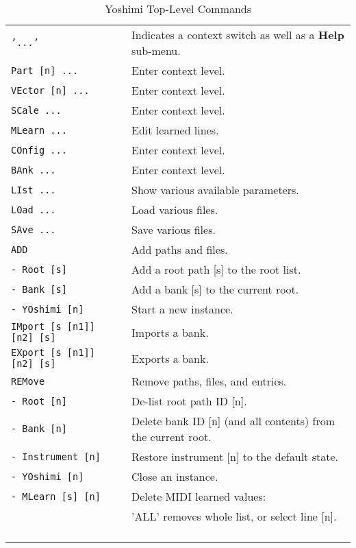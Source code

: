 \begin{center}
\begin{longtable}{p{6cm} p{10cm}}
\caption[Yoshimi Top-Level Commands]{Yoshimi Top-Level Commands} \\
\texttt{'...'} &
   Indicates a context switch as well as a \textbf{Help} sub-menu. \\
\texttt{Part [n] ...} &
   Enter context level. \\
\texttt{VEctor [n] ...} &
   Enter context level. \\
\texttt{SCale ...} &
   Enter context level. \\
\texttt{MLearn ...} &
   Edit learned lines. \\
\texttt{COnfig ...} &
   Enter context level. \\
\texttt{BAnk ...} &
   Enter context level. \\
\texttt{LIst ...} &
   Show various available parameters. \\
\texttt{LOad ...} &
   Load various files. \\
\texttt{SAve ...} &
   Save various files. \\
\texttt{ADD} &
   Add paths and files. \\
\texttt{- Root [s]} &
   Add a root path [s] to the root list. \\
\texttt{- Bank [s]} &
   Add a bank [s] to the current root. \\
\texttt{- YOshimi [n]} &
   Start a new instance. \\
\texttt{IMport [s [n1]] [n2] [s]} &
   Imports a bank. \\
\texttt{EXport [s [n1]] [n2] [s]} &
   Exports a bank. \\
\texttt{REMove} &
   Remove paths, files, and entries. \\
\texttt{- Root [n]} &
   De-list root path ID [n]. \\
\texttt{- Bank [n]} &
   Delete bank ID [n] (and all contents) from the current root. \\
\texttt{- Instrument [n]} &
   Restore instrument [n] to the default state. \\
\texttt{- YOshimi [n]} &
   Close an instance. \\
\texttt{- MLearn [s] [n]} &
   Delete MIDI learned values: \\
\texttt{ } &
   'ALL' removes whole list, or select line [n]. \\
\texttt{ } & \\


\end{longtable}
\end{center}
